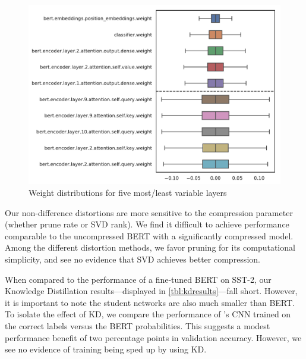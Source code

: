 \documentclass[10pt]{article}
\newcommand{\bert}{\operatorname{BERT}}
\begin{document}
\begin{figure}[htb]
\centering
\includegraphics[width=.5\textwidth]{../figs/value_by_layer.pdf}
\caption{Weight distributions for five most/least variable layers}
\label{fig:weightsbylayer}
\end{figure}

Our non-difference distortions are more sensitive to the compression parameter
(whether prune rate or SVD rank). We find it difficult to achieve performance
comparable to the uncompressed BERT with a significantly compressed model. Among
the different distortion methods, we favor pruning for its computational
simplicity, and see no evidence that SVD achieves better compression.

% 

When compared to the performance of a fine-tuned BERT on SST-2, our Knowledge
Distillation results---displayed in \cref{tbl:kdresults}---fall short. However,
it is important to note the student networks are also much smaller than BERT. To
isolate the effect of KD, we compare the performance of
\citet{kim2014convolutional}'s CNN trained on the correct labels versus the BERT
probabilities. This suggests a modest performance benefit of two percentage
points in validation accuracy. However, we see no evidence of training being
sped up by using KD.
\end{document}
